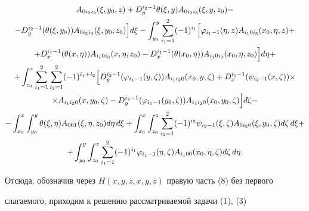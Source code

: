 \begin{gather}
A_{0i_2i_3}(\xi,y_0,z)+D^{i_2-1}_y \theta(\xi,y)A_{0i_2i_3} 


(\xi,y,z_0)- \notag \\ 


% 


-D^{i_2-1}_y(\theta(\xi,y_0))A_{0i_2i_3}(\xi,y_0,z_0)\Big]d\xi 


-\int^y_{y_0}\sum^2_{i_1=1}(-1)^{i_1}\Big[\varphi_{i_1-1} 


(\eta,z)A_{i_10i_3}(x_0,\eta,z)+\notag \\ 


% 


+D^{i_1-1}_x(\theta(x,\eta))A_{i_10i_3}(x,\eta,z_0)- 


D^{i_1-1}_x(\theta(x_0,\eta))A_{i_10i_3}(x_0,\eta,z_0) 


\Big]d\eta +\notag \\ 


%


+\int^z_{z_0}\sum^2_{i_1=1}\sum^2_{i_2=1}(-1)^{i_1+i_2} 


\Big[ D^{i_2-1}_y(\varphi_{i_1-1}(y,\zeta))A_{i_1i_20} 


(x_0,y,\zeta)+D^{i_1-1}_x(\psi_{i_2-1}(x,\zeta))\times\notag \\ 


% 


\times A_{i_1i_20}(x,y_0,\zeta)-D^{i_2-1}_y(\varphi_{i_1-1} 


(y_0,\zeta))A_{i_1i_20}(x_0,y_0,\zeta)\Big]d\zeta-\notag \\ 


% 


-\int^x_{x_0}\int^y_{y_0}\theta(\xi,\eta)A_{001} 


(\xi,\eta,z_0)d\eta\,d\xi+\int^x_{x_0}\int^z_{z_0} 


\sum^2_{i_2=1}(-1)^{i_2}\psi_{i_2-1}(\xi,\zeta) 


A_{0i_20}(\xi,y_0,\zeta)d\zeta\,d\xi+\notag \\ 


% 


+\int^y_{y_0}\int^z_{z_0}\sum^2_{i_1=1}(-1)^{i_1} 


\varphi_{i_1-1}(\eta,\zeta)A_{i_100}(x_0,\eta,\zeta) 


d\zeta\,d\eta. 


\end{gather} 


Отсюда, обозначив через $H(x,y,z,x,y,z)$ правую часть (8) без первого 


слагаемого, приходим к решению рассматриваемой задачи (1), (3) 


